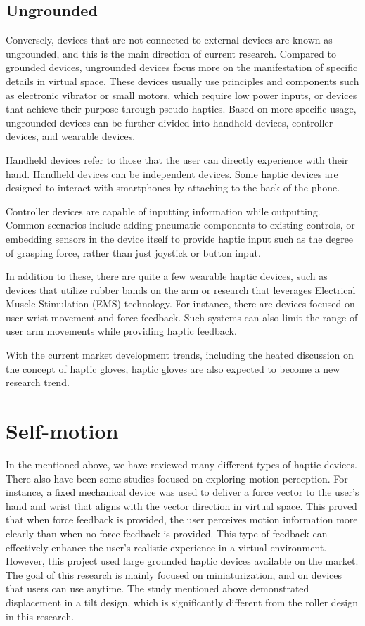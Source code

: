 \subsection{Ungrounded}
Conversely, devices that are not connected to external devices are known as ungrounded, and this is the main direction of current research. Compared to grounded devices, ungrounded devices focus more on the manifestation of specific details in virtual space. These devices usually use principles and components such as electronic vibrator\cite{ref_021} or small motors\cite{ref_018}, which require low power inputs, or devices that achieve their purpose through pseudo haptics\cite{ref_S003}. Based on more specific usage, ungrounded devices can be further divided into handheld devices, controller devices, and wearable devices.

Handheld devices refer to those that the user can directly experience with their hand. Handheld devices can be independent devices\cite{paper29}. Some haptic devices are designed to interact with smartphones by attaching to the back of the phone\cite{paper30}.

Controller devices are capable of inputting information while outputting. Common scenarios include adding pneumatic components\cite{ref_007} to existing controls, or embedding sensors in the device itself to provide haptic input such as the degree of grasping force\cite{ref_004}, rather than just joystick or button input.

In addition to these, there are quite a few wearable haptic devices, such as devices that utilize rubber bands on the arm\cite{ref_005} or research that leverages Electrical Muscle Stimulation (EMS) technology\cite{ref_EMS001}\cite{ref_EMS003}. For instance, there are devices\cite{paper31} focused on user wrist movement and force feedback. Such systems can also limit the range of user arm movements while providing haptic feedback.

With the current market development trends, including the heated discussion on the concept of haptic gloves, haptic gloves are also expected to become a new research trend.

\section{Self-motion}
In the mentioned above, we have reviewed many different types of haptic devices. There also have been some studies focused on exploring motion perception. For instance, a fixed mechanical device was used to deliver a force vector to the user's hand and wrist that aligns with the vector direction in virtual space\cite{ref_motion001}. This proved that when force feedback is provided, the user perceives motion information more clearly than when no force feedback is provided. This type of feedback can effectively enhance the user's realistic experience in a virtual environment. However, this project used large grounded haptic devices available on the market. The goal of this research is mainly focused on miniaturization, and on devices that users can use anytime. The study mentioned above demonstrated displacement in a tilt design, which is significantly different from the roller design in this research.

